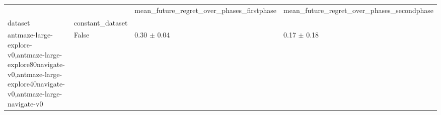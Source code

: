 \begin{tabular}{llll}
\toprule
 &  & mean_future_regret_over_phases_firstphase & mean_future_regret_over_phases_secondphase \\
dataset & constant_dataset &  &  \\
\midrule
antmaze-large-explore-v0,antmaze-large-explore80navigate-v0,antmaze-large-explore40navigate-v0,antmaze-large-navigate-v0 & False & 0.30 $\pm$ 0.04 & 0.17 $\pm$ 0.18 \\
\cline{1-4}
\bottomrule
\end{tabular}
